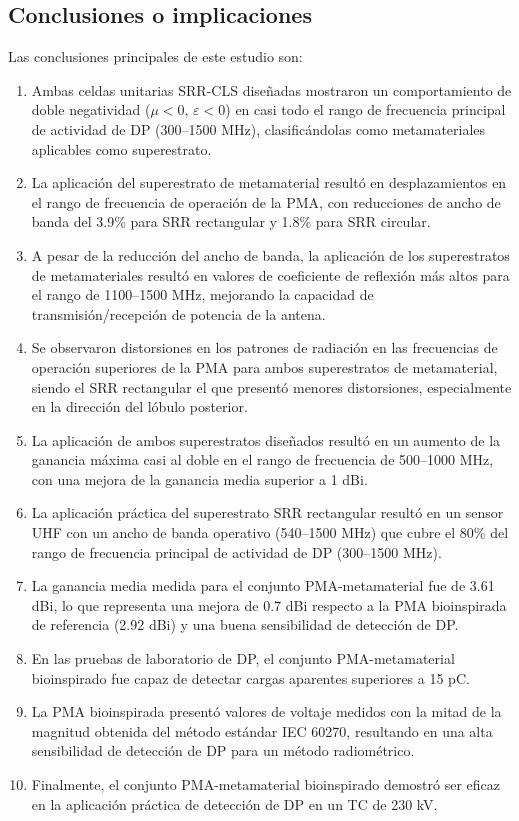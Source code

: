 \subsection*{Conclusiones o implicaciones}
Las conclusiones principales de este estudio son:
\begin{enumerate}
    \item Ambas celdas unitarias SRR-CLS diseñadas mostraron un comportamiento de doble negatividad ($\mu < 0$, $\varepsilon < 0$) en casi todo el rango de frecuencia principal de actividad de DP (300--1500 MHz), clasificándolas como metamateriales aplicables como superestrato.
    \item La aplicación del superestrato de metamaterial resultó en desplazamientos en el rango de frecuencia de operación de la PMA, con reducciones de ancho de banda del 3.9\% para SRR rectangular y 1.8\% para SRR circular.
    \item A pesar de la reducción del ancho de banda, la aplicación de los superestratos de metamateriales resultó en valores de coeficiente de reflexión más altos para el rango de 1100--1500 MHz, mejorando la capacidad de transmisión/recepción de potencia de la antena.
    \item Se observaron distorsiones en los patrones de radiación en las frecuencias de operación superiores de la PMA para ambos superestratos de metamaterial, siendo el SRR rectangular el que presentó menores distorsiones, especialmente en la dirección del lóbulo posterior.
    \item La aplicación de ambos superestratos diseñados resultó en un aumento de la ganancia máxima casi al doble en el rango de frecuencia de 500--1000 MHz, con una mejora de la ganancia media superior a 1 dBi.
    \item La aplicación práctica del superestrato SRR rectangular resultó en un sensor UHF con un ancho de banda operativo (540--1500 MHz) que cubre el 80\% del rango de frecuencia principal de actividad de DP (300--1500 MHz).
    \item La ganancia media medida para el conjunto PMA-metamaterial fue de 3.61 dBi, lo que representa una mejora de 0.7 dBi respecto a la PMA bioinspirada de referencia (2.92 dBi) y una buena sensibilidad de detección de DP.
    \item En las pruebas de laboratorio de DP, el conjunto PMA-metamaterial bioinspirado fue capaz de detectar cargas aparentes superiores a 15 pC.
    \item La PMA bioinspirada presentó valores de voltaje medidos con la mitad de la magnitud obtenida del método estándar IEC 60270, resultando en una alta sensibilidad de detección de DP para un método radiométrico.
    \item Finalmente, el conjunto PMA-metamaterial bioinspirado demostró ser eficaz en la aplicación práctica de detección de DP en un TC de 230 kV.
\end{enumerate}

